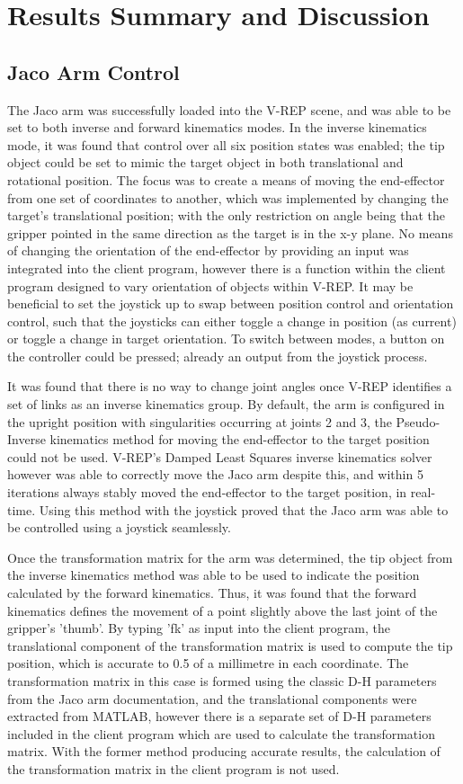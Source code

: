 \documentclass[12pt,openany,a4paper]{book}
\begin{document}
\chapter{Results Summary and Discussion}
\section{Jaco Arm Control}
The Jaco arm was successfully loaded into the V-REP scene, and was able to be set to both inverse and forward kinematics modes. In the inverse kinematics mode, it was found that control over all six position states was enabled; the tip object could be set to mimic the target object in both translational and rotational position. The focus was to create a means of moving the end-effector from one set of coordinates to another, which was implemented by changing the target's translational position; with the only restriction on angle being that the gripper pointed in the same direction as the target is in the x-y plane. No means of changing the orientation of the end-effector by providing an input was integrated into the client program, however there is a function within the client program designed to vary orientation of objects within V-REP. It may be beneficial to set the joystick up to swap between position control and orientation control, such that the joysticks can either toggle a change in position (as current) or toggle a change in target orientation. To switch between modes, a button on the controller could be pressed; already an output from the joystick process.

It was found that there is no way to change joint angles once V-REP identifies a set of links as an inverse kinematics group. By default, the arm is configured in the upright position with singularities occurring at joints 2 and 3, the Pseudo-Inverse kinematics method for moving the end-effector to the target position could not be used. V-REP's Damped Least Squares inverse kinematics solver however was able to correctly move the Jaco arm despite this, and within 5 iterations always stably moved the end-effector to the target position, in real-time. Using this method with the joystick proved that the Jaco arm was able to be controlled using a joystick seamlessly. 

Once the transformation matrix for the arm was determined, the tip object from the inverse kinematics method was able to be used to indicate the position calculated by the forward kinematics. Thus, it was found that the forward kinematics defines the movement of a point slightly above the last joint of the gripper's 'thumb'. By typing 'fk' as input into the client program, the translational component of the transformation matrix is used to compute the tip position, which is accurate to 0.5 of a millimetre in each coordinate. The transformation matrix in this case is formed using the classic D-H parameters from the Jaco arm documentation, and the translational components were extracted from MATLAB, however there is a separate set of D-H parameters included in the client program which are used to calculate the transformation matrix. With the former method producing accurate results, the calculation of the transformation matrix in the client program is not used.
\end{document}
